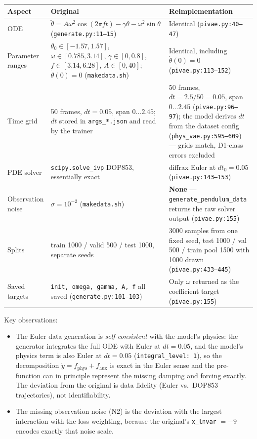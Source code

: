 \documentclass[11pt,a4paper]{article}
\newcommand{\code}[1]{\texttt{#1}}
\begin{document}
\begin{table}[h]
\centering
\small
\begin{tabularx}{\textwidth}{LXX}
\toprule
\textbf{Aspect} & \textbf{Original} & \textbf{Reimplementation} \\
\midrule
ODE & $\ddot\theta = A\omega^2\cos(2\pi f t) - \gamma\dot\theta - \omega^2\sin\theta$ (\code{generate.py:11--15}) & Identical (\code{pivae.py:40--47}) \\
Parameter ranges & $\theta_0 \in [-1.57, 1.57]$, $\omega \in [0.785, 3.14]$, $\gamma \in [0, 0.8]$, $f \in [3.14, 6.28]$, $A \in [0, 40]$; $\dot\theta(0) = 0$ (\code{makedata.sh}) & Identical, including $\dot\theta(0) = 0$ (\code{pivae.py:113--152}) \\
Time grid & 50 frames, $dt = 0.05$, span $0 \ldots 2.45$; $dt$ stored in \code{args\_*.json} and read by the trainer & 50 frames, $dt = 2.5/50 = 0.05$, span $0 \ldots 2.45$ (\code{pivae.py:96--97}); the model derives $dt$ from the dataset config (\code{phys\_vae.py:595--609}) --- grids match, D1-class errors excluded \\
PDE solver & \code{scipy.solve\_ivp} DOP853, essentially exact & diffrax Euler at $dt_0 = 0.05$ (\code{pivae.py:143--153}) \\
Observation noise & $\sigma = 10^{-2}$ (\code{makedata.sh}) & \textbf{None} --- \code{generate\_pendulum\_data} returns the raw solver output (\code{pivae.py:155}) \\
Splits & train 1000 / valid 500 / test 1000, separate seeds & 3000 samples from one fixed seed, test 1000 / val 500 / train pool 1500 with 1000 drawn (\code{pivae.py:433--445}) \\
Saved targets & \code{init, omega, gamma, A, f} all saved (\code{generate.py:101--103}) & Only $\omega$ returned as the coefficient target (\code{pivae.py:155}) \\
\bottomrule
\end{tabularx}
\end{table}

\noindent Key observations:
\begin{itemize}[nosep]
  \item The Euler data generation is \emph{self-consistent} with the model's
        physics: the generator integrates the full ODE with Euler at
        $dt = 0.05$, and the model's physics term is also Euler at $dt = 0.05$
        (\code{integral\_level: 1}), so the decomposition
        $\dot y = f_\mathrm{phys} + f_\mathrm{aux}$ is exact in the Euler sense
        and the pre-function can in principle represent the missing damping and
        forcing exactly. The deviation from the original is data fidelity
        (Euler vs.\ DOP853 trajectories), not identifiability.
  \item The missing observation noise (N2) is the deviation with the largest
        interaction with the loss weighting, because the original's
        \code{x\_lnvar} $= -9$ encodes exactly that noise scale.
\end{itemize}
\end{document}
